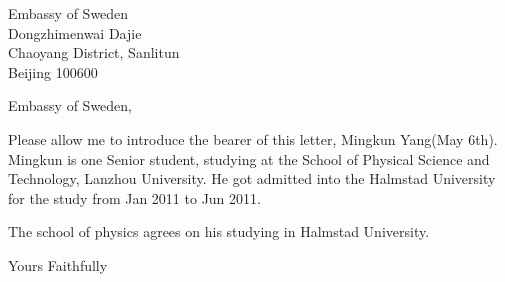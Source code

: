 \documentclass{letter}
\begin{document}
\begin{letter}{ Embassy of Sweden
				\\ Dongzhimenwai Dajie
				\\ Chaoyang District, Sanlitun
				\\ Beijing 100600}
	\opening{Embassy of Sweden,}
	Please allow me to introduce the bearer of this letter, Mingkun Yang(May 6th). Mingkun is one Senior student, studying at the School of Physical 
	Science and Technology, Lanzhou University. He got admitted into the Halmstad University for the study from Jan 2011 to Jun 2011.

	
	The school of physics agrees on his studying in Halmstad University.
	\closing{Yours Faithfully}
\end{letter}
\end{document}
